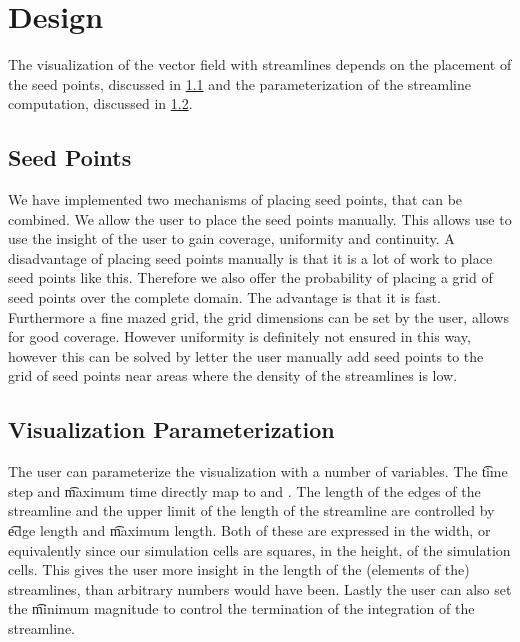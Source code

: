 \section{Design}
\label{s:streamlines:design}
The visualization of the vector field with streamlines depends on the placement of the seed points, discussed in \cref{ss:streamlines:design:seedpoints} and the parameterization of the streamline computation, discussed in \cref{ss:streamlines:design:parameterization}.

\subsection{Seed Points}
\label{ss:streamlines:design:seedpoints}
We have implemented two mechanisms of placing seed points, that can be combined. We allow the user to place the seed points manually. This allows use to use the insight of the user to gain coverage, uniformity and continuity. A disadvantage of placing seed points manually is that it is a lot of work to place seed points like this. Therefore we also offer the probability of placing a grid of seed points over the complete domain. The advantage is that it is fast. Furthermore a fine mazed grid, the grid dimensions can be set by the user, allows for good coverage. However uniformity is definitely not ensured in this way, however this can be solved by letter the user manually add seed points to the grid of seed points near areas where the density of the streamlines is low.

\subsection{Visualization Parameterization}
\label{ss:streamlines:design:parameterization}
The user can parameterize the visualization with a number of variables. The \t{time step}  and \t{maximum time} directly map to \integrationTime and \timeInterval. The length of the edges of the streamline and the upper limit of the length of the streamline are controlled by \t{edge length} and \t{maximum length}. Both of these are expressed in the width, or equivalently since our simulation cells are squares, in the height, of the simulation cells. This gives the user more insight in the length of the (elements of the) streamlines, than arbitrary numbers would have been. Lastly the user can also set the \t{minimum magnitude} to control the termination of the integration of the streamline.

